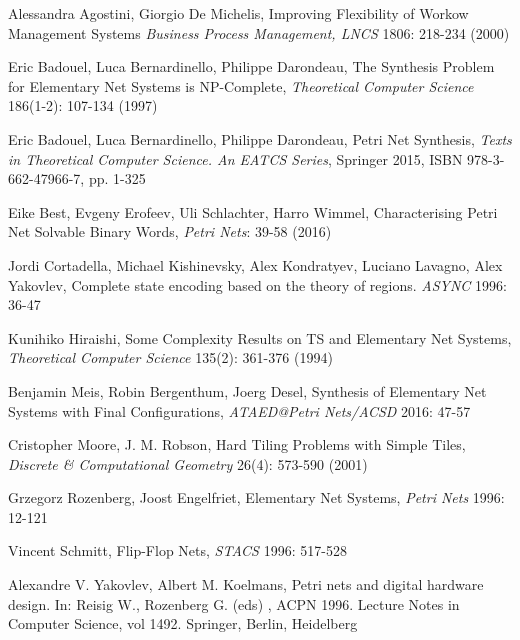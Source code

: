 \documentclass[english]{lipics_hacked}
\begin{document}

\begin{thebibliography}{99}

 Alessandra Agostini, Giorgio De Michelis, Improving Flexibility of Workow Management Systems \emph{Business Process Management, LNCS} 1806: 218-234 (2000)

 Eric Badouel, Luca Bernardinello, Philippe Darondeau, The Synthesis Problem for Elementary Net Systems is NP-Complete, \emph{Theoretical Computer Science} 186(1-2): 107-134 (1997)

 Eric Badouel, Luca Bernardinello, Philippe Darondeau, Petri Net Synthesis, \emph{Texts in Theoretical Computer Science. An EATCS Series}, Springer 2015, ISBN 978-3-662-47966-7, pp. 1-325

 Eike Best, Evgeny Erofeev, Uli Schlachter, Harro Wimmel, Characterising Petri Net Solvable Binary Words,  \emph{Petri Nets}: 39-58 (2016)

 Jordi Cortadella, Michael Kishinevsky, Alex Kondratyev, Luciano Lavagno, Alex Yakovlev, Complete state encoding based on the theory of regions. \emph{ASYNC} 1996: 36-47

 Kunihiko Hiraishi, Some Complexity Results on TS and Elementary Net Systems, \emph{Theoretical Computer Science} 135(2): 361-376 (1994)

 Benjamin Meis, Robin Bergenthum, Joerg Desel, Synthesis of Elementary Net Systems with Final Configurations, \emph{ATAED@Petri Nets/ACSD} 2016: 47-57

 Cristopher Moore, J. M. Robson, Hard Tiling Problems with Simple Tiles, \emph{Discrete \& Computational Geometry} 26(4): 573-590 (2001)

 Grzegorz Rozenberg, Joost Engelfriet, Elementary Net Systems,  \emph{Petri Nets} 1996: 12-121

Vincent Schmitt, Flip-Flop Nets, \emph{STACS} 1996: 517-528


 Alexandre V. Yakovlev, Albert M. Koelmans, Petri nets and digital hardware design. In: Reisig W., Rozenberg G. (eds) , ACPN 1996. Lecture Notes in Computer Science, vol 1492. Springer, Berlin, Heidelberg
\end{thebibliography}
\end{document}

